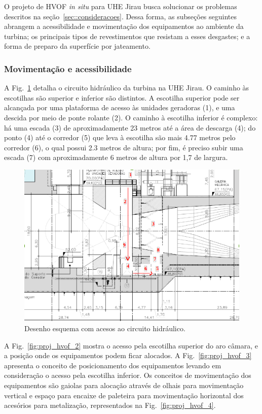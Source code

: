 O projeto de HVOF \textit{in situ} para UHE Jirau busca solucionar os problemas
descritos na seção~\ref{sec::consideracoes}. Dessa forma, as subseções seguintes
abrangem a acessibilidade e movimentação dos equipamentos ao ambiente da
turbina; os principais tipos de revestimentos que resistam a esses desgastes; e
a forma de preparo da superfície por jateamento.

\subsubsection{Movimentação e acessibilidade}
A Fig.~\ref{fig:proj_hvof_1} detalha o circuito hidráulico da turbina na UHE
Jirau. O caminho às escotilhas são superior e inferior são distintos. A
escotilha superior pode ser alcançada por uma plataforma de acesso às unidades
geradoras (1), e uma descida por meio de ponte rolante (2). O caminho à
escotilha inferior é complexo: há uma escada (3) de
aproximadamente 23 metros até a área de descarga (4); do ponto (4) até o
corredor (5) que leva à escotilha são mais 4.77 metros pelo corredor (6), o qual
possui 2.3 metros de altura; por fim, é preciso subir uma escada (7) com
aproximadamente 6 metros de altura por 1,7 de largura.

\begin{figure}
	\centering
	\includegraphics[width=0.7\columnwidth]{sota/figs/projeto/proj_hvof_1.png}
    \caption{Desenho esquema com acesos ao circuito hidráulico.}
    \label{fig:proj_hvof_1}
\end{figure}

A Fig.~\ref{fig:proj_hvof_2} mostra o acesso pela escotilha superior
do aro câmara, e a posição onde os equipamentos podem ficar alocados. A
Fig.~\ref{fig:proj_hvof_3} apresenta o conceito de posicionamento dos
equipamentos levando em consideração o acesso pela escotilha inferior.
Os conceitos de movimentação dos equipamentos são gaiolas para alocação através
de olhais para movimentação vertical e espaço para encaixe de paleteira para
movimentação horizontal dos acesórios para metalização, representados na
Fig.~\ref{fig:proj_hvof_4}.

